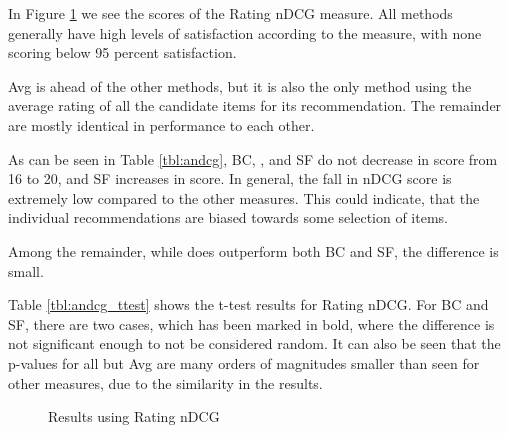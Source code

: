 In Figure \ref{fig:andcg} we see the scores of the Rating nDCG measure. All methods generally have high levels of satisfaction according to the measure, with none scoring below 95 percent satisfaction.

Avg is ahead of the other methods, but it is also the only method using the average rating of all the candidate items for its recommendation. The remainder are mostly identical in performance to each other.

As can be seen in Table \ref{tbl:andcg}, BC, \MC, and SF do not decrease in score from 16 to 20, and SF increases in score. In general, the fall in nDCG score is extremely low compared to the other measures. This could indicate, that the individual recommendations are biased towards some selection of items.

Among the remainder, while \MC does outperform both BC and SF, the difference is small.

Table \ref{tbl:andcg_ttest} shows the t-test results for Rating nDCG. For BC and SF, there are two cases, which has been marked in bold, where the difference is not significant enough to not be considered random. It can also be seen that the p-values for all but Avg are many orders of magnitudes smaller than seen for other measures, due to the similarity in the results.
\begin{figure}[H]
	\caption{Results using Rating nDCG}\label{fig:andcg}
\end{figure}

